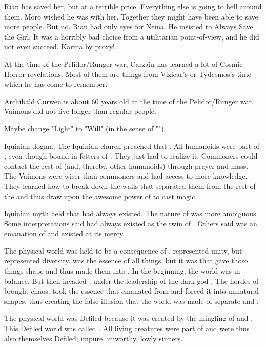   Rian has saved her, but at a terrible price. 
  Everything else is going to hell around them. 
  Moro wished he was with her.
  Together they might have been able to save more people.
  But no.
  Rian had only eyes for Neina.
  He insisted to Always Save the Girl.
  It was a horribly bad choice from a utilitarian point-of-view, and he did not even succeed. 
  Karma by proxy! 

At the time of the Pelidor/Runger war, Carzain has learned a lot of Cosmic Horror revelations.
Most of them are things from Vizicar's or Tydesmos's time which he has come to remember. 

Archibald Curwen is about 60 years old at the time of the Pelidor/Runger war. 
Vaimons did not live longer than regular people. 

Maybe change "Light" to "Will" (in the sense of "\iquin"). 

Iquinian dogma:
  The Iquinian church preached that . 
  All humanoids were part of \iquin, even though bound in fetters of \itzach.
  They just had to realize it. 
  Commoners could contact the rest of \iquin (and, thereby, other humanoids) through prayer and mass. 
  The Vaimons were wiser than commoners and had access to more knowledge. 
  They learned how to break down the walls that separated them from the rest of the \iquin and thus draw upon the awesome power of \iquin to cast magic. 
  
  Iquinian myth held that \iquin had always existed. 
  The nature of \itzach was more ambiguous. 
  Some interpretations said \itzach had always existed as the twin of \iquin.
  Others said \itzach was an emanation of \iquin and existed at its mercy. 
  
  The physical world was held to be a consequence of \itzach. 
  \Iquin represented unity, but \itzach represented diversity. 
  \Iquin was the essence of all things, but it was \itzach that gave those things shape and thus made them into .
  In the beginning, the world was in balance.
  But then \itzach invaded \iquin, under the leadership of the dark god \Isphet. 
  The hordes of \itzach brought chaos. 
  \Itzach took the essence that emanated from \iquin and forced it into unnatural shapes, thus creating the false illusion that the world was made of separate  and .
  
  The physical world was Defiled because it was created by the mingling of \iquin and \itzach. 
  This Defiled world was called \Gehinnom. 
  All living creatures were part of \Gehinnom and were thus also themselves Defiled; impure, unworthy, lowly sinners. 

